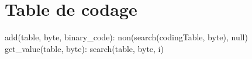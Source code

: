 \section{Table de codage}

\begin{algorithme}
    {add(table, byte, binary\_code): non(search(codingTable, byte), null)}
    {get\_value(table, byte): search(table, byte, i)}
\end{algorithme}